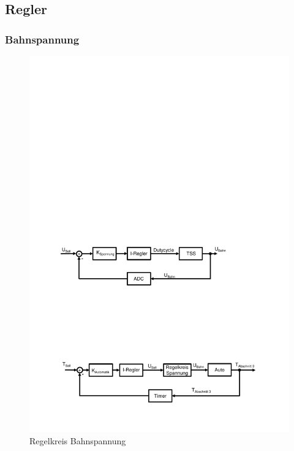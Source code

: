 \documentclass[a4paper, 11pt]{report}
\begin{document}
	\subsection{Regler}\label{subsec:control}
		\subsubsection{Bahnspannung}
		\begin{figure}[ht]
			\centering
			\includegraphics[width=\textwidth]{rec/URegler.pdf}
			\caption{Regelkreis Bahnspannung}
			\label{fig:Ucontrol}
		\end{figure}
\end{document}
